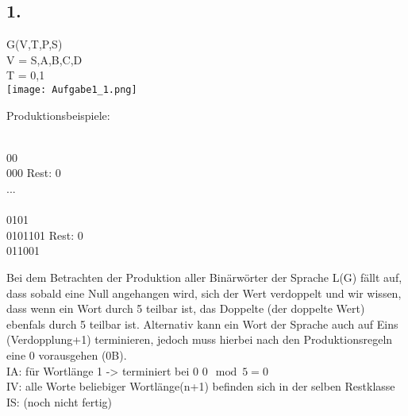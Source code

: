 \documentclass[11pt]{article}
\theoremstyle{definition}
\theoremstyle{remark}
\begin{document}
    \subsection*{1.}
    \begin{normalsize}
        G(V,T,P,S)\\
        V = {S,A,B,C,D}\\
        T = {0,1}\\

        \texttt{[image: Aufgabe1\_1.png]}

        \noindent
        Produktionsbeispiele:\\
        \begin{multicols}{2}

            \\
            00\\
            000 \hspace{15mm} Rest: 0\\
            ... \\

            \\
            0101 \\
            0101101  \hspace{10mm} Rest: 0\\
            011001 \\

        \end{multicols}
        Bei dem Betrachten der Produktion aller Binärwörter der Sprache L(G) fällt auf, dass
        sobald eine Null angehangen wird, sich der Wert verdoppelt und wir wissen, dass wenn ein Wort
        durch 5 teilbar ist, das Doppelte (der doppelte Wert) ebenfals durch 5 teilbar ist.
        Alternativ kann ein Wort der Sprache auch auf Eins (Verdopplung+1) terminieren, jedoch muss hierbei nach den
        Produktionsregeln eine 0 vorausgehen (0B). \\
        \vspace{10mm}
        IA: für Wortlänge 1 -> terminiert bei 0 \rightarrow \hspace{2mm} $0\mod5=0$\\
        IV: alle Worte beliebiger Wortlänge(n+1) befinden sich in der selben Restklasse\\
        IS: (noch nicht fertig)
    \end{normalsize}
\end{document}

